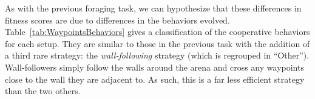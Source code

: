     As with the previous foraging task, we can hypothesize that these differences in fitness scores are due to differences in the behaviors evolved. Table~\ref{tab:WaypointsBehaviors} gives a classification of the cooperative behaviors for each setup. They are similar to those in the previous task with the addition of a third rare strategy: the \emph{wall-following} strategy (which is regrouped in ``Other''). Wall-followers simply follow the walls around the arena and cross any waypoints close to the wall they are adjacent to. As such, this is a far less efficient strategy than the two others. 


    \begin{table}[h]
      \caption{\textbf{Cooperative strategies evolved.}
      Repartition of the different strategies evolved in each of the 60 independent runs for each setup in the waypoints task. We indicate in each cell the number of simulations where a particular strategy evolved: \emph{Leader/follower} (Lead.), \emph{Turning} (Turn.) or \emph{Other}. ``Other'' regroups wall-following strategies or simulations where no recognizable strategy evolved.}
      \label{tab:WaypointsBehaviors}
    \end{table}


